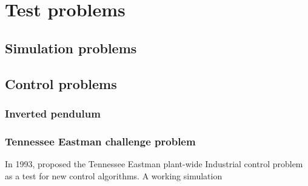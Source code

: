 \chapter{Test problems}

\section{Simulation problems}


\section{Control problems}
\subsection{Inverted pendulum}
\subsection{Tennessee Eastman challenge problem}
In 1993, \citet{downs.vogel1993plant-wide} proposed the Tennessee
Eastman plant-wide Industrial control problem as a test for new
control algorithms.  A working simulation 


